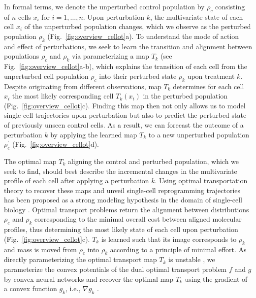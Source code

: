 In formal terms, we denote the unperturbed control population by $\rho_c$ consisting of $n$ cells $x_i$ for $i = 1, \dots, n$. Upon perturbation $k$, the multivariate state of each cell $x_i$ of the unperturbed population changes, which we observe as the perturbed population $\rho_k$ (Fig.~\ref{fig:overview_cellot}a).
To understand the mode of action and effect of perturbations, we seek to learn the transition and alignment between populations $\rho_c$ and $\rho_k$ via parameterizing a map $T_k$ (see Fig.~\ref{fig:overview_cellot}a-b), which explains the transition of each cell from the unperturbed cell population $\rho_c$ into their perturbed state $\rho_k$ upon treatment $k$.
Despite originating from  different observations, map $T_k$ determines for each cell $x_i$ the most likely corresponding cell $T_k(x_i)$ in the perturbed population (Fig.~\ref{fig:overview_cellot}c).
Finding this map then not only allows us to model single-cell trajectories upon perturbation but also to predict the perturbed state of previously unseen control cells. As a result, we can forecast the outcome of a perturbation $k$  by applying the learned map $T_k$ to a new unperturbed population $\rho^\prime_c$ (Fig.~\ref{fig:overview_cellot}d).

 The optimal map $T_k$ aligning the control and perturbed population, which we seek to find, should best describe the incremental changes in the multivariate profile of each cell after applying a perturbation $k$. Using optimal transportation theory \citep{villani2021topics, santambrogio2015optimal} to recover these maps and unveil single-cell reprogramming trajectories has been proposed as a strong modeling hypothesis in the domain of single-cell biology \citep{schiebinger2019optimal, cang2020inferring, demetci2022scot, huizing2022optimal, lavenant2021towards, zhang2021optimal}.
Optimal transport problems return the alignment between distributions $\rho_c$ and $\rho_k$ corresponding to the minimal overall cost between aligned molecular profiles, thus determining the most likely state of each cell upon perturbation (Fig.~\ref{fig:overview_cellot}c).
$T_k$ is learned such that its image corresponds to $\rho_k$ and mass is moved from $\rho_c$ into $\rho_k$ according to a principle of minimal effort.
As directly parameterizing the optimal transport map $T_k$ \citep{korotin2021wasserstein, yang2018scalable, prasad2020optimal} is unstable \citep[Table 1]{makkuva2020optimal}, we parameterize the convex potentials of the dual optimal transport problem $f$ and $g$ by convex neural networks \citep{amos2017input} and recover the optimal map $T_k$ using the gradient of a convex function $g_k$, i.e., $\nabla g_k$ \citep{makkuva2020optimal}.

